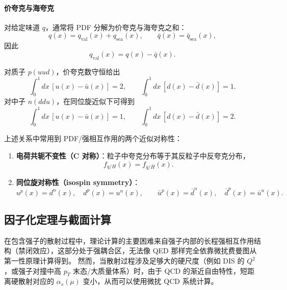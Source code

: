 \paragraph{价夸克与海夸克}
对给定味道 $q$，通常将 PDF 分解为价夸克与海夸克之和：
\begin{equation}
    q(x)=q_{\mathrm{val}}(x)+q_{\mathrm{sea}}(x),\qquad 
    \bar q(x)=\bar q_{\mathrm{sea}}(x),
\end{equation}
因此
\begin{equation}
    q_{\mathrm{val}}(x)=q(x)-\bar q(x).
\end{equation}

\begin{example}[质子与中子的价夸克数守恒]
    对质子 $p(uud)$，价夸克数守恒给出
    \begin{equation}
        \int_0^1 dx\,[u(x)-\bar u(x)]=2,\qquad
        \int_0^1 dx\,[d(x)-\bar d(x)]=1.
    \end{equation}
    对中子 $n(ddu)$，在同位旋近似下可得到
    \begin{equation}
        \int_0^1 dx\,[u(x)-\bar u(x)]=1,\qquad
        \int_0^1 dx\,[d(x)-\bar d(x)]=2.
    \end{equation}
\end{example}

上述关系中常用到 PDF/强相互作用的两个近似对称性：
\begin{enumerate}
    \item \textbf{电荷共轭不变性（C 对称）}：粒子中夸克分布等于其反粒子中反夸克分布，
    \begin{equation}
        f_{q/H}(x) = f_{\bar q/\bar H}(x).
    \end{equation}
    \item \textbf{同位旋对称性（isospin symmetry）}：
    \begin{equation}
        u^p(x)=d^n(x),\quad d^p(x)=u^n(x),\qquad
        \bar u^p(x)=\bar d^n(x),\quad \bar d^p(x)=\bar u^n(x).
    \end{equation}
\end{enumerate}


\subsection{因子化定理与截面计算}

在包含强子的散射过程中，理论计算的主要困难来自强子内部的长程强相互作用结构（禁闭效应），这部分处于强耦合区，无法像 QED 那样完全依靠微扰费曼图从第一性原理计算得到。
然而，当散射过程涉及足够大的硬尺度（例如 DIS 的 $Q^2$，或强子对撞中高 $p_T$ 末态/大质量体系）时，由于 QCD 的渐近自由特性，短距离硬散射对应的 $\alpha_s(\mu)$ 变小，从而可以使用微扰 QCD 系统计算。

